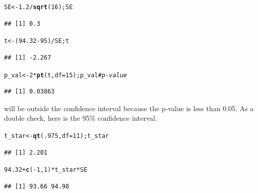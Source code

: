 \documentclass[twoside]{book}\usepackage[]{graphicx}\usepackage[]{xcolor}
\makeatletter
\newcommand{\hlnum}[1]{\textcolor[rgb]{0.686,0.059,0.569}{#1}}%
\newcommand{\hlcom}[1]{\textcolor[rgb]{0.678,0.584,0.686}{\textit{#1}}}%
\newcommand{\hlopt}[1]{\textcolor[rgb]{0,0,0}{#1}}%
\newcommand{\hlstd}[1]{\textcolor[rgb]{0.345,0.345,0.345}{#1}}%
\newcommand{\hlkwb}[1]{\textcolor[rgb]{0.69,0.353,0.396}{#1}}%
\newcommand{\hlkwc}[1]{\textcolor[rgb]{0.333,0.667,0.333}{#1}}%
\newcommand{\hlkwd}[1]{\textcolor[rgb]{0.737,0.353,0.396}{\textbf{#1}}}%
\newenvironment{kframe}{%
 \def\at@end@of@kframe{}%
 \ifinner\ifhmode%
  \def\at@end@of@kframe{\end{minipage}}%
  \begin{minipage}{\columnwidth}%
 \fi\fi%
 \def\FrameCommand##1{\hskip\@totalleftmargin \hskip-\fboxsep
 \colorbox{shadecolor}{##1}\hskip-\fboxsep
     \hskip-\linewidth \hskip-\@totalleftmargin \hskip\columnwidth}%
 \MakeFramed {\advance\hsize-\width
   \@totalleftmargin\z@ \linewidth\hsize
   \@setminipage}}%
 {\par\unskip\endMakeFramed%
 \at@end@of@kframe}
\newenvironment{knitrout}{}{} %
\makeatother
\begin{document}
\begin{solution}
\begin{knitrout}
\color{fgcolor}\begin{kframe}
\begin{alltt}
\hlstd{SE} \hlkwb{<-} \hlnum{1.2} \hlopt{/} \hlkwd{sqrt}\hlstd{(}\hlnum{16}\hlstd{); SE}
\end{alltt}
\begin{verbatim}
## [1] 0.3
\end{verbatim}
\begin{alltt}
\hlstd{t} \hlkwb{<-} \hlstd{(}\hlnum{94.32} \hlopt{-} \hlnum{95}\hlstd{)} \hlopt{/} \hlstd{SE; t}
\end{alltt}
\begin{verbatim}
## [1] -2.267
\end{verbatim}
\begin{alltt}
\hlstd{p_val} \hlkwb{<-} \hlnum{2} \hlopt{*} \hlkwd{pt}\hlstd{(t,} \hlkwc{df} \hlstd{=} \hlnum{15}\hlstd{); p_val}    \hlcom{# p-value}
\end{alltt}
\begin{verbatim}
## [1] 0.03863
\end{verbatim}
\end{kframe}
\end{knitrout}
	95 will be 
	outside 
	the confidence interval because the p-value is 
	less than 0.05. 
	As a double check, here is the 95\% confidence interval.
\begin{knitrout}
\color{fgcolor}\begin{kframe}
\begin{alltt}
\hlstd{t_star} \hlkwb{<-} \hlkwd{qt}\hlstd{(}\hlnum{.975}\hlstd{,} \hlkwc{df} \hlstd{=} \hlnum{11}\hlstd{); t_star}
\end{alltt}
\begin{verbatim}
## [1] 2.201
\end{verbatim}
\begin{alltt}
\hlnum{94.32} \hlopt{+} \hlkwd{c}\hlstd{(}\hlopt{-}\hlnum{1}\hlstd{,}\hlnum{1}\hlstd{)} \hlopt{*} \hlstd{t_star} \hlopt{*} \hlstd{SE}
\end{alltt}
\begin{verbatim}
## [1] 93.66 94.98
\end{verbatim}
\end{kframe}
\end{knitrout}
\end{solution}
\end{document}
